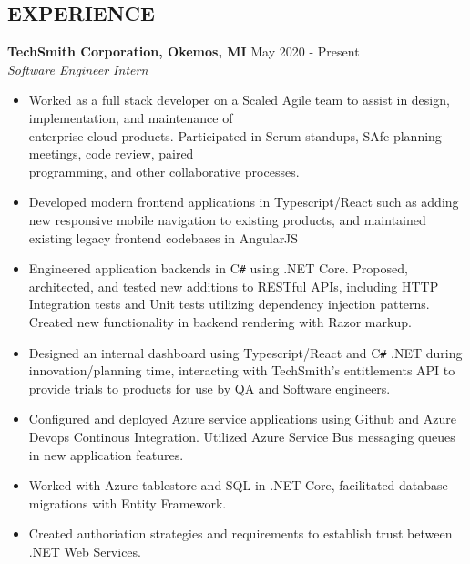 \documentclass[overlapped]{res}
\begin{document}
\begin{resume}
    \section{EXPERIENCE}
    \textbf{TechSmith Corporation, Okemos, MI}
    \hfill May 2020 - Present \\
    {\sl Software Engineer Intern}
    \begin{itemize}  \itemsep -2pt %
        \item Worked as a full stack developer on a Scaled Agile team to assist in design, implementation, and maintenance of \\
        enterprise cloud products. Participated in Scrum standups, SAfe planning meetings, code review, paired \\
        programming, and other collaborative processes.
        \item Developed modern frontend applications in Typescript/React such as adding new responsive mobile navigation to existing products, and maintained existing legacy frontend codebases in AngularJS
        \item Engineered application backends in C\texttt{\#} using .NET Core. Proposed, architected, and tested new additions to RESTful APIs, 
        including HTTP Integration tests and Unit tests utilizing dependency injection patterns. 
        Created new functionality in backend rendering with Razor markup.
        \item Designed an internal dashboard using Typescript/React and C\texttt{\#} .NET during innovation/planning time, 
        interacting with TechSmith's entitlements API to provide trials to products for use by QA and Software engineers.
        \item Configured and deployed Azure service applications using Github and Azure Devops Continous Integration. Utilized Azure Service Bus messaging queues in new application features.
        \item Worked with Azure tablestore and SQL in .NET Core, facilitated database migrations with Entity Framework. 
        \item Created authoriation strategies and requirements to establish trust between .NET Web Services.
    \end{itemize}


\end{resume}
\end{document}
